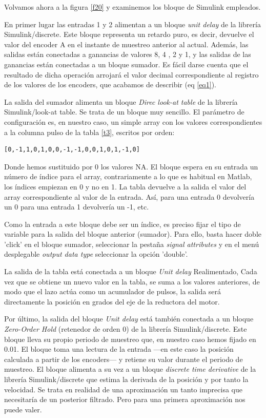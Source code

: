 \documentclass[10pt,a4paper]{report}
\begin{document}
Volvamos ahora a la figura \ref{f20} y examinemos los bloque de Simulink empleados.

En primer lugar las entradas 1 y 2 alimentan a un bloque \emph{unit delay} de la librería Simulink/discrete. Este bloque representa un retardo puro, es decir, devuelve el valor del encoder A en el instante de muestreo anterior al actual. Además, las salidas están conectadas a ganancias de valores 8, 4 , 2 y 1, y las salidas de las ganancias están conectadas a un bloque sumador. Es fácil darse cuenta que el resultado de dicha operación arrojará el valor decimal correspondiente al registro de los valores de los encoders, que acabamos de describir (eq \ref{eq1}).

La salida del sumador alimenta un bloque \emph{Direc look-at table} de la librería Simulink/look-at table. Se trata de un bloque muy sencillo. El parámetro de configuración es, en nuestro caso, un simple array con los valores correspondientes a la columna pulso de la tabla \ref{t3}, escritos por orden:
\begin{verbatim}
[0,-1,1,0,1,0,0,-1,-1,0,0,1,0,1,-1,0]
\end{verbatim}
Donde hemos sustituido por 0 los valores NA. El bloque espera  en su entrada un número de índice para el array, contrariamente a lo que es habitual en Matlab, los índices empiezan en 0 y  no en 1. La tabla devuelve a la salida el valor del array correspondiente al valor de la entrada. Así, para una entrada 0 devolvería un 0 para una entrada 1 devolvería un -1, etc.

Como la entrada a este bloque debe ser un índice, es preciso fijar el tipo de variable para la salida del bloque anterior (sumador). Para ello, basta hacer doble 'click' en el bloque sumador, seleccionar la pestaña \emph{signal attributes} y en el menú desplegable \emph{output data type} seleccionar la opción 'double'. 

La salida de la tabla está conectada a un bloque \emph{Unit delay} Realimentado, Cada vez que se obtiene un nuevo valor en la tabla, se suma a los valores anteriores, de modo que el lazo actúa como un acumulador de pulsos, la salida será directamente la posición en grados del eje de la reductora del motor.

Por último, la salida del bloque \emph{Unit delay} está también conectada a un bloque \emph{Zero-Order Hold} (retenedor de orden 0) de la librería Simulink/discrete. Este bloque lleva su propio periodo de muestreo que, en nuestro caso hemos fijado en 0.01. El bloque toma una lectura de la entrada ---en este caso la posición calculada a partir de los encoders--- y retiene su valor durante el periodo de muestreo. El bloque alimenta a su vez a un bloque \emph{discrete time derivative} de la librería Simulink/discrete que estima la derivada de la posición y por tanto la velocidad. Se trata en realidad de una aproximación un tanto imprecisa que necesitaría de un posterior filtrado. Pero para una primera aproximación nos puede valer.
\end{document}
